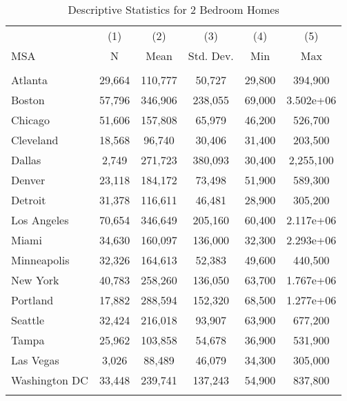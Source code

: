 \begin{table}
\begin{centering}
\caption{Descriptive Statistics for 2 Bedroom Homes}\label{tab:2bed}
\begin{tabular}{lccccc} \hline
 & (1) & (2) & (3) & (4) & (5) \\
MSA & N & Mean & Std. Dev. & Min & Max \\ \hline
 &  &  &  &  &  \\
 Atlanta            & 29,664 & 110,777 & 50,727 & 29,800 & 394,900 \\
 Boston             & 57,796 & 346,906 & 238,055 & 69,000 & 3.502e+06 \\
 Chicago            & 51,606 & 157,808 & 65,979 & 46,200 & 526,700 \\
 Cleveland          & 18,568 & 96,740 & 30,406 & 31,400   &203,500 \\
 Dallas             &  2,749 & 271,723 & 380,093 & 30,400 &  2,255,100\\
 Denver             & 23,118 & 184,172 & 73,498 & 51,900  & 589,300 \\
 Detroit            & 31,378 & 116,611 & 46,481  & 28,900 & 305,200 \\
 Los Angeles        & 70,654 & 346,649 & 205,160 & 60,400 & 2.117e+06 \\
 Miami              & 34,630 & 160,097 & 136,000 & 32,300 & 2.293e+06 \\
 Minneapolis        & 32,326 & 164,613 & 52,383 & 49,600 & 440,500 \\
 New York           & 40,783 & 258,260 & 136,050 & 63,700 & 1.767e+06 \\
 Portland           & 17,882 & 288,594 & 152,320 & 68,500 & 1.277e+06 \\
 Seattle            & 32,424 & 216,018 & 93,907 & 63,900 & 677,200 \\
 Tampa              & 25,962 & 103,858 & 54,678 & 36,900 & 531,900 \\
 Las Vegas          & 3,026 & 88,489 & 46,079 & 34,300 & 305,000 \\
 Washington DC      & 33,448 & 239,741 & 137,243 & 54,900 & 837,800 \\


  &  &  &  &  &  \\ \hline
\end{tabular}
\end{centering}
\end{table}
